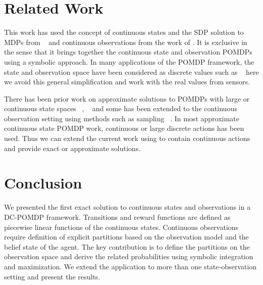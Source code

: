 \documentclass{article} %
\begin{document}
\section{Related Work} 
This work has used the concept of continuous states and the SDP solution to MDPs from ~\cite{sanner_uai11} and continuous observations from the work of \cite{pascalPomdp}. It is exclusive in the sense that it brings together the continuous state and observation POMDPs using a symbolic approach. 
In many applications of the POMDP framework, the state and observation space have been considered as discrete values such as ~\cite{steam2} here we avoid this general simplification and work with the real values from sensors.

There has been prior work on approximate solutions to POMDPs with large or continuous state spaces ~\cite{Thrun99h}, ~\cite{Perseus} and some has been extended to the continuous observation setting using methods such as sampling ~\cite{PerseusObs}.
In most approximate continuous state POMDP work, continuous or large discrete actions has been used. Thus we can extend the current work using \cite{zamaniAAAI} to contain continuous actions and provide exact or approximate solutions. 

\section{Conclusion}
We presented the first exact solution to continuous states and observations in a DC-POMDP framework. Transitions and reward functions are defined as piecewise linear functions of the continuous states. Continuous observations require definition of explicit partitions based on the observation model and the belief state of the agent. The key contribution is to define the partitions on the observation space and derive the related probabilities using symbolic integration and maximization. We extend the application to more than one state-observation setting and present the results.  
 
 


\end{document}

